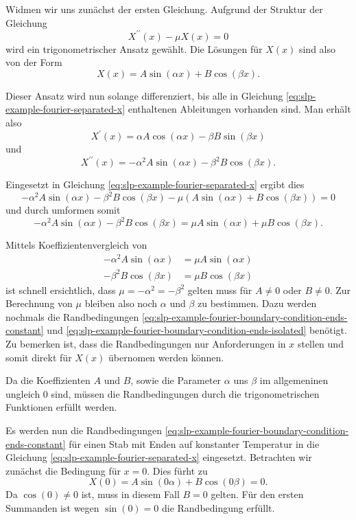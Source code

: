 Widmen wir uns zunächst der ersten Gleichung.
Aufgrund der Struktur der Gleichung
\[
    X^{\prime \prime}(x) - \mu X(x)
    =
    0
\]
wird ein trigonometrischer Ansatz gewählt.
Die Lösungen für $X(x)$ sind also von der Form
\[
    X(x)
    =
    A \sin \left( \alpha x\right) + B \cos \left( \beta x\right).
\]

Dieser Ansatz wird nun solange differenziert, bis alle in Gleichung 
\eqref{eq:slp-example-fourier-separated-x} enthaltenen Ableitungen vorhanden
sind.
Man erhält also
\[
    X^{\prime}(x)
    =
    \alpha A \cos \left( \alpha x \right) -
    \beta B \sin \left( \beta x \right)
\]
und
\[
    X^{\prime \prime}(x)
    =
    -\alpha^{2} A \sin \left( \alpha x \right) -
    \beta^{2} B \cos \left( \beta x \right).
\]

Eingesetzt in Gleichung \eqref{eq:slp-example-fourier-separated-x} ergibt dies
\[
    -\alpha^{2}A\sin(\alpha x) - \beta^{2}B\cos(\beta x) -
    \mu\left(A\sin(\alpha x) + B\cos(\beta x)\right)
    =
    0
\]
und durch umformen somit
\[
    -\alpha^{2}A\sin(\alpha x) - \beta^{2}B\cos(\beta x)
    =
    \mu A\sin(\alpha x) + \mu B\cos(\beta x).
\]

Mittels Koeffizientenvergleich von
\[
\begin{aligned}
    -\alpha^{2}A\sin(\alpha x)
    &=
    \mu A\sin(\alpha x)
    \\
    -\beta^{2}B\cos(\beta x)
    &=
    \mu B\cos(\beta x)
\end{aligned}
\]
ist schnell ersichtlich, dass $ \mu = -\alpha^{2} = -\beta^{2} $ gelten muss für
$ A \neq 0 $ oder $ B \neq 0 $.
Zur Berechnung von $ \mu $ bleiben also noch  $ \alpha $ und $ \beta $ zu
bestimmen.
Dazu werden nochmals die Randbedingungen
\eqref{eq:slp-example-fourier-boundary-condition-ends-constant} und
\eqref{eq:slp-example-fourier-boundary-condition-ends-isolated} benötigt.
Zu bemerken ist, dass die Randbedingungen nur Anforderungen in $x$ stellen und
somit direkt für $X(x)$ übernomen werden können.

Da die Koeffizienten $A$ und $B$, sowie die Parameter $\alpha$ uns $\beta$ im
allgemeninen ungleich $0$ sind, müssen die Randbedingungen durch die
trigonometrischen Funktionen erfüllt werden.

Es werden nun die Randbedingungen
\eqref{eq:slp-example-fourier-boundary-condition-ends-constant} für einen Stab
mit Enden auf konstanter Temperatur in die Gleichung 
\eqref{eq:slp-example-fourier-separated-x} eingesetzt.
Betrachten wir zunächst die Bedingung für $x = 0$.
Dies fürht zu
\[
    X(0)
    =
    A \sin(0 \alpha) + B \cos(0 \beta)
    =
    0.
\]
Da $\cos(0) \neq 0$ ist, muss in diesem Fall $B = 0$ gelten.
Für den ersten Summanden ist wegen $\sin(0) = 0$ die Randbedingung erfüllt.

